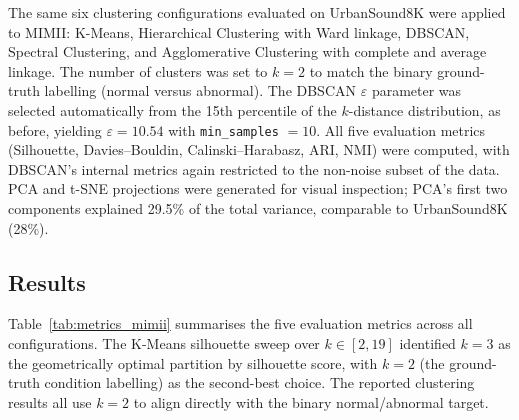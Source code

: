 \documentclass[runningheads,a4paper,11pt]{report}
\begin{document}
The same six clustering configurations evaluated on UrbanSound8K were applied to MIMII: K-Means, Hierarchical Clustering with Ward linkage, DBSCAN, Spectral Clustering, and Agglomerative Clustering with complete and average linkage. The number of clusters was set to $k = 2$ to match the binary ground-truth labelling (normal versus abnormal). The DBSCAN $\varepsilon$ parameter was selected automatically from the 15th percentile of the $k$-distance distribution, as before, yielding $\varepsilon = 10.54$ with \texttt{min\_samples} $= 10$. All five evaluation metrics (Silhouette, Davies--Bouldin, Calinski--Harabasz, ARI, NMI) were computed, with DBSCAN's internal metrics again restricted to the non-noise subset of the data. PCA and t-SNE projections were generated for visual inspection; PCA's first two components explained 29.5\% of the total variance, comparable to UrbanSound8K (28\%).

\subsection{Results}
\label{section:resultsMIMII}

Table~\ref{tab:metrics_mimii} summarises the five evaluation metrics across all configurations. The K-Means silhouette sweep over $k \in [2, 19]$ identified $k = 3$ as the geometrically optimal partition by silhouette score, with $k = 2$ (the ground-truth condition labelling) as the second-best choice. The reported clustering results all use $k = 2$ to align directly with the binary normal/abnormal target.
\end{document}
